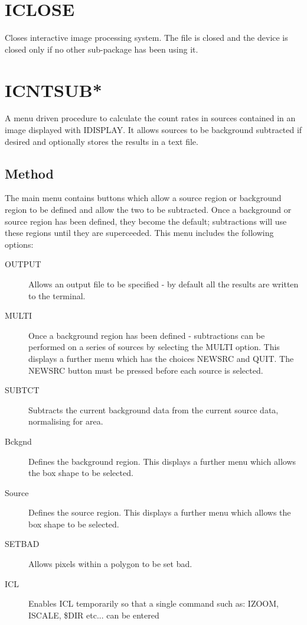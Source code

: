 \documentclass{book}
\renewcommand{\_}{{\tt\char'137}}     %
\begin{document}
\section{ICLOSE}
Closes interactive image processing system. The file is closed
and the device is closed only if no other sub-package has been
using it.
 
\section{ICNTSUB*}
A menu driven procedure to calculate the count rates in sources
contained in an image displayed with IDISPLAY. It allows sources
to be background subtracted if desired and optionally stores the
results in a text file.
 
\subsection{Method}
The main menu contains buttons which allow a source region or
background region to be defined and allow the two to be subtracted.
Once a background or source region has been defined, they become
the default; subtractions will use these regions until they are
superceeded. This menu includes the following options:
 
 
\begin{description}
\item[OUTPUT]
Allows an output file to be specified - by default all
the results are written to the terminal.
\item[MULTI]
Once a background region has been defined - subtractions
can be performed on a series of sources by selecting the
MULTI option. This displays a further menu which has the
choices NEWSRC and QUIT. The NEWSRC button must be pressed
before each source is selected.
\item[SUBTCT]
Subtracts the current background data from the current
source data, normalising for area.
\item[Bckgnd]
Defines the background region. This displays a further menu
which allows the box shape to be selected.
\item[Source]
Defines the source region. This displays a further menu
which allows the box shape to be selected.
\item[SETBAD]
Allows pixels within a polygon to be set bad.
\item[ICL]
Enables ICL temporarily so that a single command such as:
IZOOM, ISCALE, \$DIR etc... can be entered
\end{description}
\end{document}
